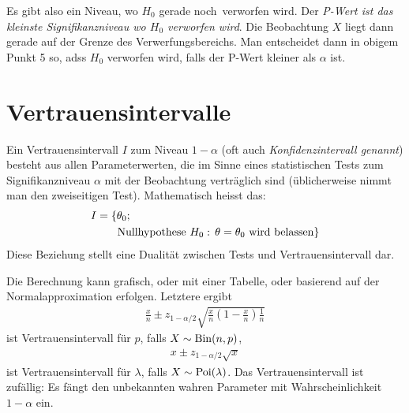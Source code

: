 Es gibt also ein Niveau, wo $H_0$ \glqq gerade noch\grqq \ verworfen wird. Der \emph{P-Wert ist das kleinste Signifikanzniveau wo $H_0$ verworfen wird}. Die Beobachtung $X$ liegt dann gerade auf der Grenze des Verwerfungsbereichs. Man entscheidet dann in obigem Punkt 5 so, adss $H_0$ verworfen wird, falls der P-Wert kleiner als $\alpha$ ist.
\section{Vertrauensintervalle}
Ein Vertrauensintervall $I$ zum Niveau $1-\alpha$ (oft auch \emph{Konfidenzintervall genannt}) besteht aus allen Parameterwerten, die im Sinne eines statistischen Tests zum Signifikanzniveau $\alpha$ mit der Beobachtung verträglich sind (üblicherweise nimmt man den zweiseitigen Test). Mathematisch heisst das:
\begin{align*}
	I&=\{ \theta_0;\\
		&\hphantom{=\{}\text{ Nullhypothese }H_0:\, \theta=\theta_0\text{ wird belassen} \}
\end{align*}
Diese Beziehung stellt eine Dualität zwischen Tests und Vertrauensintervall dar. 

Die Berechnung kann grafisch, oder mit einer Tabelle, oder basierend auf der Normalapproximation erfolgen. Letztere ergibt
\begin{gather*}
	\frac{x}{n}\pm z_{1-\alpha/2}\sqrt{\frac{x}{n}\left( 1-\frac{x}{n} \right)\frac{1}{n}}
\end{gather*}
ist Vertrauensintervall für $p$, falls $X\sim \operatorname{Bin}(n,p)$,
\begin{gather*}
	x\pm z_{1-\alpha/2}\sqrt{x}
\end{gather*}
ist Vertrauensintervall für $\lambda$, falls $X\sim \operatorname{Poi}(\lambda)$.
Das Vertrauensintervall ist zufällig: Es fängt den unbekannten wahren Parameter mit Wahrscheinlichkeit $1-\alpha$ ein.
